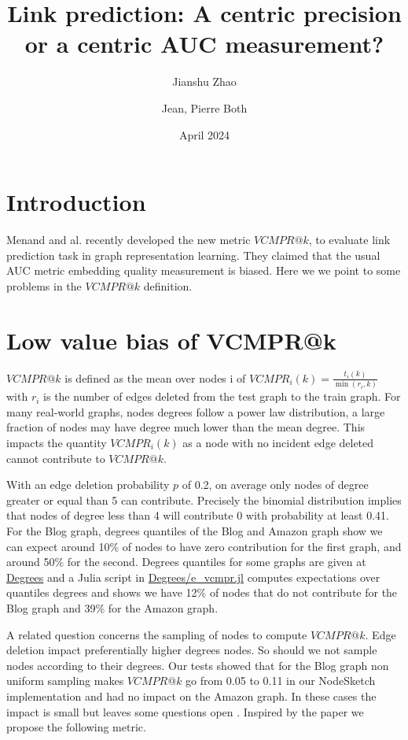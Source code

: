 \documentclass{article}
\title{Link prediction: A centric precision or a centric AUC measurement?}
\author[1]{Jianshu Zhao}
\author[2,*]{Jean, Pierre Both}
\affil[1]{Center for Bioinformatics and Computational Genomics, Georgia Institute of Technology, Atlanta, Georgia, USA}
\affil[2]{Université Paris-Saclay, CEA, List, Palaiseau, France. (Retired)}
\affil[*]{Corresponding author : jeanpierre.both@gmail.com}
\date{April 2024}
\begin{document}
\maketitle

\section{Introduction}

Menand and al. \cite{Menand2024link} recently developed the new metric $VCMPR@k$, to evaluate link prediction task in graph representation learning.
They claimed that the usual AUC metric embedding quality measurement is biased.
Here we we point to some problems in the  $VCMPR@k$ definition.


\section{Low value bias of VCMPR@k}
$VCMPR@k$ is defined as the mean over nodes i of  $ VCMPR_{i}(k)= \frac{t_{i}(k)}{\min(r_{i},k)}$ with $ r_{i} $ is the number of edges deleted from the test graph to the train graph.
For many real-world graphs, nodes degrees follow a power law distribution, a large fraction of nodes may have degree much lower than the mean degree.
This impacts the quantity $ VCMPR_{i}(k)$ as a node with no incident edge deleted cannot contribute to $VCMPR@k$.

With an edge deletion probability $p$ of 0.2, on average only nodes of degree greater or equal than 5 can contribute.
Precisely the binomial distribution implies that nodes of degree less than 4 will contribute 0 with probability at least 0.41.
For the Blog graph,  degrees quantiles of the Blog and Amazon graph show we can expect around 10\% of nodes to have zero contribution for the first graph,
and around 50\% for the second.
Degrees quantiles for some graphs are given at \href{https://github.com/jean-pierreBoth/linkauc/tree/master/Degrees}{\color{blue}Degrees}
and a Julia script in \href{https://github.com/jean-pierreBoth/linkauc/tree/master/Degrees}{\color{blue}Degrees/e\_vcmpr.jl}
computes expectations over quantiles degrees and shows we have 12\% of nodes that do not contribute for the Blog graph and 39\% for the Amazon graph.

A related question concerns the sampling of nodes to compute $VCMPR@k$. Edge deletion impact preferentially higher degrees nodes.
So should we not sample nodes according to their degrees. Our tests showed that for the Blog graph non uniform sampling makes
$VCMPR@k$ go from 0.05 to 0.11 in our NodeSketch \citep{Yang2019nodesketch} implementation and had no impact on the Amazon graph.
In these cases the impact is small but leaves some questions open .
Inspired by the paper we propose the following metric.
\end{document}

